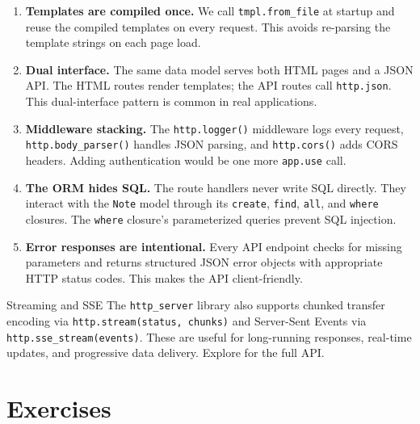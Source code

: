 \begin{enumerate}
  \item \textbf{Templates are compiled once.} We call \lstinline|tmpl.from_file| at startup and reuse the compiled templates on every request.
  This avoids re-parsing the template strings on each page load.

  \item \textbf{Dual interface.} The same data model serves both HTML pages and a JSON API.
  The HTML routes render templates; the API routes call \lstinline|http.json|.
  This dual-interface pattern is common in real applications.

  \item \textbf{Middleware stacking.} The \lstinline|http.logger()| middleware logs every request, \lstinline|http.body_parser()| handles JSON parsing, and \lstinline|http.cors()| adds CORS headers.
  Adding authentication would be one more \lstinline|app.use| call.

  \item \textbf{The ORM hides SQL.} The route handlers never write SQL directly.
  They interact with the \lstinline|Note| model through its \lstinline|create|, \lstinline|find|, \lstinline|all|, and \lstinline|where| closures.
  The \lstinline|where| closure's parameterized queries prevent SQL injection.

  \item \textbf{Error responses are intentional.} Every API endpoint checks for missing parameters and returns structured JSON error objects with appropriate HTTP status codes.
  This makes the API client-friendly.
\end{enumerate}

\begin{notebox}{Streaming and SSE}
The \lstinline|http_server| library also supports chunked transfer encoding via \lstinline|http.stream(status, chunks)| and Server-Sent Events via \lstinline|http.sse_stream(events)|.
These are useful for long-running responses, real-time updates, and progressive data delivery.
Explore  for the full API.
\end{notebox}

\section*{Exercises}\label{sec:web-exercises}


